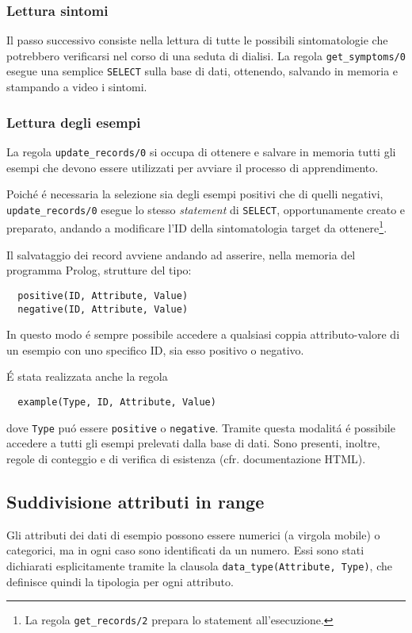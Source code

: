 \documentclass[preprint]{acm_proc_article-sp}
\begin{document}
\subsubsection{Lettura sintomi}
Il passo successivo consiste nella lettura di tutte le possibili sintomatologie che potrebbero verificarsi nel corso di una seduta di dialisi. La regola \verb|get_symptoms/0| esegue una semplice \texttt{SELECT} sulla base di dati, ottenendo, salvando in memoria e stampando a video i sintomi.

\subsubsection{Lettura degli esempi}
La regola \verb|update_records/0| si occupa di ottenere e salvare in memoria tutti gli esempi che devono essere utilizzati per avviare il processo di apprendimento.

Poich\'e \'e necessaria la selezione sia degli esempi positivi che di quelli negativi, \verb|update_records/0| esegue lo stesso \textit{statement} di \texttt{SELECT}, opportunamente creato e preparato, andando a modificare l'ID della sintomatologia target da ottenere\footnote{La regola \verb|get_records/2| prepara lo statement all'esecuzione.}.

Il salvataggio dei record avviene andando ad asserire, nella memoria del programma Prolog, strutture del tipo:
\begin{verbatim}
  positive(ID, Attribute, Value)
  negative(ID, Attribute, Value)
\end{verbatim}
In questo modo \'e sempre possibile accedere a qualsiasi coppia attributo-valore di un esempio con uno specifico ID, sia esso positivo o negativo.

\'E stata realizzata anche la regola
\begin{verbatim}
  example(Type, ID, Attribute, Value)
\end{verbatim}
dove \verb|Type| pu\'o essere \verb|positive| o \verb|negative|. Tramite questa modalit\'a \'e possibile accedere a tutti gli esempi prelevati dalla base di dati. Sono presenti, inoltre, regole di conteggio e di verifica di esistenza (cfr. documentazione HTML).

\subsection{Suddivisione attributi in range}
\label{prolog-categories}
Gli attributi dei dati di esempio possono essere numerici (a virgola mobile) o categorici, ma in ogni caso sono identificati da un numero. Essi sono stati dichiarati esplicitamente tramite la clausola \verb|data_type(Attribute, Type)|, che definisce quindi la tipologia per ogni attributo.
\end{document}
